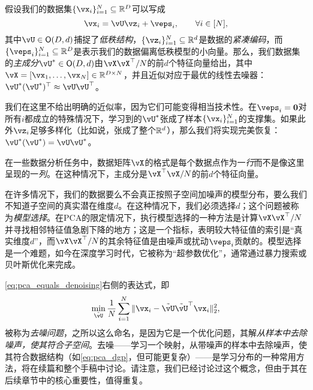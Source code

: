 \documentclass[../../book-main_zh.tex]{subfiles}
\begin{document}
\begin{theorem}\label{thm:pca}
    假设我们的数据集\(\{\vx_{i}\}_{i = 1}^{N} \subseteq \R^{D}\)可以写成
    \begin{equation}
        \vx_{i} = \vU\vz_{i} + \veps_{i}, \qquad \forall i \in [N],
    \end{equation}
    其中\(\vU \in \O(D, d)\)捕捉了\textit{低秩结构}，\(\{\vz_{i}\}_{i = 1}^{N} \subseteq \R^{d}\)是数据的\textit{紧凑编码}，而\(\{\veps_{i}\}_{i = 1}^{N} \subseteq \R^{D}\)是表示我们的数据偏离低秩模型的小向量。那么，我们数据集的\textit{主成分}\(\vU^{\ast} \in \O(D, d)\)由\(\vX\vX^{\top}/N\)的前\(d\)个特征向量给出，其中\(\vX = [\vx_{1}, \dots, \vx_{N}] \in \R^{D \times N}\)，并且近似对应于最优的线性去噪器：\(\vU^{\ast}(\vU^{\ast})^{\top} \approx \vU\vU^{\top}\)。
\end{theorem}
我们在这里不给出明确的近似率，因为它们可能变得相当技术性。在\(\veps_{i} = \vzero\)对所有\(i\)都成立的特殊情况下，学习到的\(\vU^{\ast}\)张成了样本\(\{\vx_{i}\}_{i = 1}^{N}\)的支撑集。如果此外\(\vz_{i}\)足够多样化（比如说，张成了整个\(\mathbb{R}^{d}\)），那么我们将实现完美恢复：\(\vU^{\ast}(\vU^{\ast}) = \vU\vU^{\ast}\)。


\begin{remark}
    在一些数据分析任务中，数据矩阵\(\vX\)的格式是每个数据点作为一\textit{行}而不是像这里呈现的一\textit{列}。在这种情况下，主成分是\(\vX^{\top}\vX/N\)的前\(d\)个特征向量。
\end{remark}


\begin{remark}[通过去噪特征值进行基选择]
    在许多情况下，我们的数据要么不会真正按照子空间加噪声的模型分布，要么我们不知道子空间的真实潜在维度\(d\)。在这种情况下，我们必须选择\(d\)；这个问题被称为\textit{模型选择}。在PCA的限定情况下，执行模型选择的一种方法是计算\(\vX\vX^{\top}/N\)并寻找相邻特征值急剧下降的地方；这是一个指标，表明较大特征值的索引是“真实维度\(d\)”，而\(\vX\vX^{\top}/N\)的其余特征值是由噪声或扰动\(\veps_{i}\)贡献的。模型选择是一个难题，如今在深度学习时代，它被称为“超参数优化”，通常通过暴力搜索或贝叶斯优化来完成。%
\end{remark}

\begin{remark}[去噪样本]
    \eqref{eq:pca_equals_denoising}右侧的表达式，即
    \begin{equation}\label{eq:orthogonal_denoising}
        \min_{\tilde{\vU}}\frac{1}{N}\sum_{i = 1}^{N}\norm{\vx_{i} - \tilde{\vU}\tilde{\vU}^{\top}\vx_{i}}_{2}^{2},
    \end{equation}
    被称为\textit{去噪问题}，之所以这么命名，是因为它是一个优化问题，其解\textit{从样本中去除噪声，使其符合子空间}。去噪——学习一个映射，从带噪声的样本中去除噪声，使其符合数据结构（如\eqref{eq:pca_dgp}，但可能更复杂）——是学习分布的一种常用方法，将在续篇和整个手稿中讨论。请注意，我们已经讨论过这个概念，但由于其在后续章节中的核心重要性，值得重复。
\end{remark}
\end{document}
